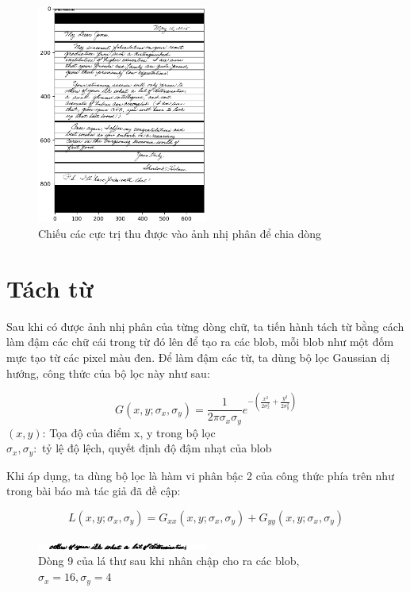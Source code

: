 \documentclass[a4paper]{article}
\begin{document}
\begin{figure}
    \centering
    \includegraphics[width=0.5\textwidth]{mapline.png}
    \caption{Chiếu các cực trị thu được vào ảnh nhị phân để chia dòng}
    \label{fig:fig4}
\end{figure}

\pagebreak

\section{Tách từ}
\label{sec:3}

Sau khi có được ảnh nhị phân của từng dòng chữ, ta tiến hành tách từ bằng cách làm đậm các chữ cái trong từ đó lên để tạo ra các blob, mỗi blob như một đốm mực tạo từ các pixel màu đen. Để làm đậm các từ, ta dùng bộ lọc Gaussian dị hướng, công thức của bộ lọc này như sau:

\begin{equation*}
    G(x, y; \sigma_x, \sigma_y) = \frac 1{2\pi \sigma_x\sigma_y} e^{-(\frac {x^2}{2\sigma_x^2} + \frac {y^2}{2\sigma_y^2})}
\end{equation*}
    $(x, y)$: Tọa độ của điểm x, y trong bộ lọc\\
    $\sigma_x, \sigma_y:$ tỷ lệ độ lệch, quyết định độ đậm nhạt của blob

Khi áp dụng, ta dùng bộ lọc là hàm vi phân bậc 2 của công thức phía trên như trong bài báo mà tác giả đã đề cập:

\begin{equation*}
    L(x, y; \sigma_x,\sigma_y) = G_{xx}(x, y; \sigma_x, \sigma_y) + G_{yy}(x, y; \sigma_x, \sigma_y)
\end{equation*}

\begin{figure}[b]
    \centering
    \includegraphics[width=0.5\textwidth]{line9.png}
    \caption{Dòng 9 của lá thư sau khi nhân chập cho ra các blob, $\sigma_x = 16, \sigma_y = 4$}
    \label{fig:fig5}
\end{figure}
\end{document}
